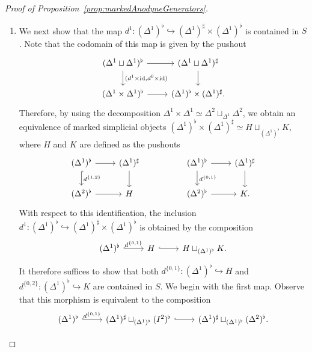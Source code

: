 \documentclass[reqno]{amsart}
\numberwithin{equation}{subsection}
\theoremstyle{plain}
\theoremstyle{definition}
\let\into=\hookrightarrow
\DeclareMathOperator{\id}{id}
\begin{document}
\begin{proof}[{Proof of Proposition~\ref{prop:markedAnodyneGenerators}}]
\begin{enumerate}[resume]
	\item We next show that the map $d^1\colon (\Delta^1)^\flat\into(\Delta^1)^\sharp\times(\Delta^1)^\flat$ is contained in $S$. Note that the codomain of this map is given by the pushout
	\begin{equation*}
	\begin{tikzcd}
	(\Delta^1\sqcup\Delta^1)^\flat\arrow[r]\arrow[d, "{(d^1\times\id, d^0\times\id)}"] & (\Delta^1\sqcup\Delta^1)^\sharp\arrow[d]\\
	(\Delta^1\times\Delta^1)^\flat\arrow[r] & (\Delta^1)^\flat\times(\Delta^1)^\sharp.
	\end{tikzcd}
	\end{equation*}
	Therefore, by using the decomposition $\Delta^1\times\Delta^1\simeq\Delta^2\sqcup_{\Delta^1}\Delta^2$, we obtain an equivalence of marked simplicial objects $(\Delta^1)^\flat \times(\Delta^1)^\sharp\simeq H\sqcup_{(\Delta^1)^\flat}K$, where $H$ and $K$ are defined as the pushouts
	\begin{equation*}
	\begin{tikzcd}
	(\Delta^1)^\flat\arrow[r]\arrow[d, hookrightarrow, "d^{\{1,2\}}"] & (\Delta^1)^\sharp\arrow[d] && (\Delta^1)^\flat\arrow[r] \arrow[d, "d^{\{0,1\}}"]& (\Delta^1)^\sharp\arrow[d]\\
	(\Delta^2)^\flat\arrow[r] & H && (\Delta^2)^\flat\arrow[r] & K.
	\end{tikzcd}
	\end{equation*}
	With respect to this identification, the inclusion $d^1\colon (\Delta^1)^\flat\into(\Delta^1)^\sharp\times(\Delta^1)^\flat$ is obtained by the composition
	\begin{equation*}
	\begin{tikzcd}
	(\Delta^1)^\flat\arrow[r, hookrightarrow,"d^{\{0,1\}}"]& H\arrow[r, hookrightarrow] & H\sqcup_{(\Delta^1)^\flat} K.
	\end{tikzcd}
	\end{equation*}
	It therefore suffices to show that both $d^{\{0,1\}}\colon (\Delta^1)^\flat\into H$ and $d^{\{0,2\}}\colon (\Delta^1)^\flat\into K$ are contained in $S$. We begin with the first map. Observe that this morphism is equivalent to the composition
	\begin{equation*}
	\begin{tikzcd}
	(\Delta^1)^\flat \arrow[r, hookrightarrow, "d^{\{0,1\}}"] & (\Delta^1)^\sharp\sqcup_{(\Delta^1)^\flat}(I^2)^\flat\arrow[r, hookrightarrow] & (\Delta^1)^\sharp\sqcup_{(\Delta^1)^\flat}(\Delta^2)^\flat.
	\end{tikzcd}

\end{equation*}
\end{enumerate}
\end{proof}
\end{document}
